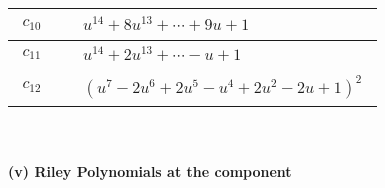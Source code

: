\documentclass[1p]{elsarticle_modified}
\theoremstyle{definition}
\begin{document}
\begin{tabular}{m{50pt}|m{274pt}}
\hline $$\begin{aligned}c_{10}\end{aligned}$$&$\begin{aligned}
&u^{14}+8 u^{13}+\cdots+9 u+1
\end{aligned}$\\
\hline $$\begin{aligned}c_{11}\end{aligned}$$&$\begin{aligned}
&u^{14}+2 u^{13}+\cdots- u+1
\end{aligned}$\\
\hline $$\begin{aligned}c_{12}\end{aligned}$$&$\begin{aligned}
&(u^7-2 u^6+2 u^5- u^4+2 u^2-2 u+1)^2
\end{aligned}$\\
\hline
\end{tabular}\\~\\
\newpage\renewcommand{\arraystretch}{1}
\flushleft \textbf{(v) Riley Polynomials at the component}\newline \\
\end{document}
